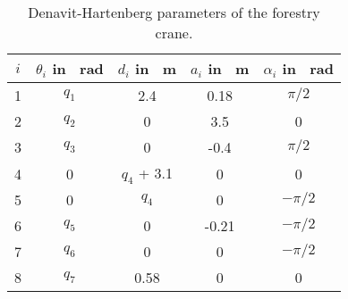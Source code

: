 \begin{table}[h]
    
    \caption{Denavit-Hartenberg parameters of the forestry crane.}\label{tab:DHParams}
        	\begin{center}
            	\begin{tabular}{c|cccc}
                        \hline
            		$i$ & $\theta_i$ in \SI{}{\radian} & $d_i$ in \SI{}{\meter} & $a_i$ in \SI{}{\meter} & $\alpha_i$ in \SI{}{\radian}\\
            		\hline
            		1   &            $q_1$ & 2.4     & 0.18      &$\pi/2$\\
            		2   &            $q_2$ & 0         & 3.5    &0\\
            		3   &            $q_3$ & 0         & -0.4   &$\pi/2$\\
            		4   &                0 & $q_4$ + 3.1     & 0         &0\\
            		5   &                0 & $q_4$     & 0         &$-\pi/2$\\
            		6   &            $q_5$ & 0         & -0.21   &$-\pi/2$\\
            		7   &            $q_6$ & 0         & 0         &$-\pi/2$\\
            		8   &            $q_7$ & 0.58     & 0         &0\\
                    \hline
            	\end{tabular}
        	\end{center}
    
    \end{table}
\fi    

\iffalse
    Using the above kinematic relations, the wrist position of the grapple, $\mathbf{d}_g^\mathrm{T} = [g_x,g_y,g_z]$, is taken from  
    \begin{equation}
        \vec{H}_{0}^{8} = 
        \begin{bmatrix}
            \mathbf{R}_0^8 & \mathbf{d}_g \\
            \mathbf{0}^\mathrm{T} & 1
        \end{bmatrix} \:.
        \label{eq:transformation}
    \end{equation}
\fi    

